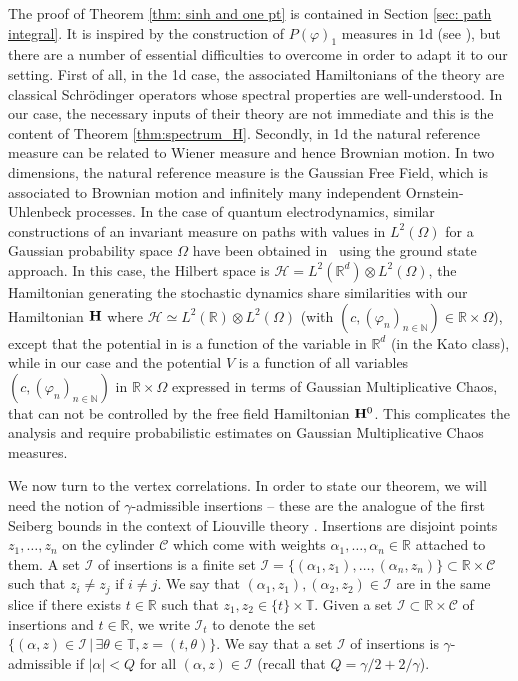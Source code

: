 \documentclass[11pt]{amsart}
\numberwithin{equation}{section}
\theoremstyle{definition}
\newcommand{\R}{\mathbb{R}}
\newcommand{\N}{\mathbb{N}}
\newcommand{\mc}{\mathcal}
\def\T{\mathbb{T}}
\begin{document}
The proof of Theorem \ref{thm: sinh and one pt} is contained in Section \ref{sec: path integral}. It is inspired by the construction of $P(\varphi)_1$ measures in 1d (see \cite{OS99, LHB}), but there are a number of essential difficulties to overcome in order to adapt it to our setting. First of all, in the 1d case, the associated Hamiltonians of the theory are classical Schr\"odinger operators whose spectral properties are well-understood. In our case, the necessary inputs of their theory are not immediate and this is the content of Theorem \ref{thm:spectrum_H}. Secondly, in 1d the natural reference measure can be related to Wiener measure and hence Brownian motion. In two dimensions, the natural reference measure is the Gaussian Free Field, which is associated to Brownian motion and infinitely many independent Ornstein-Uhlenbeck processes. In the case of quantum electrodynamics, similar constructions of an invariant measure on paths with values in $L^2(\Omega)$ for a Gaussian probability space $\Omega$ have been obtained in \cite{Hiroshima1} using the ground state approach. In this case, the Hilbert space is $\mc{H}=L^2(\R^d)\otimes L^2(\Omega)$, the Hamiltonian generating the stochastic dynamics share similarities with our Hamiltonian ${\bf H}$ where $\mc{H}\simeq L^2(\R)\otimes L^2(\Omega)$ (with $(c,(\varphi_n)_{n\in \N})\in \R \times \Omega$), except that the potential in \cite{Hiroshima1} is a function of the variable in $\R^d$ (in the Kato class), while in our case and the potential $V$ is a function of all variables $(c,(\varphi_n)_{n\in \N})$ in $\R \times \Omega$ expressed in terms of Gaussian Multiplicative Chaos, that can not be controlled by the free field Hamiltonian ${\bf H}^0$. This complicates the analysis and require probabilistic estimates on Gaussian Multiplicative Chaos measures.


We now turn to the vertex correlations. In order to state our theorem, we will need the notion of $\gamma$-admissible insertions -- these are the analogue of the first Seiberg bounds in the context of Liouville theory \cite{DKRV16}. 
Insertions are disjoint points $z_1,\dots,z_n$ on the cylinder $\mc{C}$ which come with weights  $\alpha_1,\dots,\alpha_n\in \R$ attached to them. A set $\mc{I}$ of insertions is a finite set $\mathcal{I}=\{(\alpha_1,z_1),\dots,(\alpha_n,z_n)\}\subset \R\times \mc{C}$ such that $z_i\not= z_j$ if $i\not=j$. We say that $(\alpha_1,z_1),(\alpha_2,z_2) \in \mc{I}$ are in the same slice if there exists $t \in \R$ such that $z_1,z_2 \in \{t\} \times \T$. 
Given a set $\mathcal{I}\subset \R\times \mc{C}$ of insertions and $t \in \R$, we write $\mathcal{I}_t$ to denote the set $\{ (\alpha,z) \in \mathcal{I} \, |\, \exists \theta \in \T, z = (t,\theta) \}$. We say that a set $\mc{I}$ of insertions is $\gamma$-admissible if $|\alpha|<Q$ for all $(\alpha,z) \in \mathcal{I}$ (recall that $Q=\gamma/2+2/\gamma$). 
\end{document}
